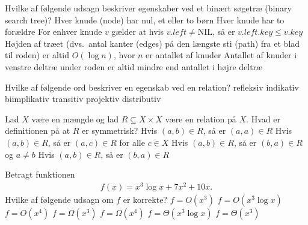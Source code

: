 Hvilke af følgende udsagn beskriver egenskaber ved et binært søgetræ (binary search tree)?
\fleresvar
\mulighederstart
\svar Hver knude (node) har nul, et eller to børn \korrekt
\svar Hver knude har to forældre
\svar For enhver knude $v$ gælder at hvis $v.left \neq \text{NIL}$, så er $v.left.key \leq v.key$ \korrekt
\svar Højden af træet (dvs.~antal kanter (edges) på den længste sti (path) fra et blad til roden) er altid $O(\log n)$, hvor $n$ er antallet af knuder
\svar Antallet af knuder i venstre deltræ under roden er altid mindre end antallet i højre deltræ
\mulighederslut
{}


Hvilke af følgende ord beskriver en egenskab ved en relation?
\fleresvar
\mulighederstart
\svar refleksiv \korrekt
\svar indikativ
\svar biimplikativ
\svar transitiv \korrekt
\svar projektiv
\svar distributiv
\mulighederslut
{}


Lad $X$ være en mængde og lad $R \subseteq X \times X$ være en relation på $X$.
Hvad er definitionen på at $R$ er symmetrisk?
\etsvar
\mulighederstart
\svar Hvis $(a,b) \in R$, så er $(a,a) \in R$
\svar Hvis $(a,b) \in R$, så er $(a,c) \in R$ for alle $c \in X$
\svar Hvis $(a,b) \in R$, så er $(b,a) \in R$ og $a \neq b$
\svar Hvis $(a,b) \in R$, så er $(b,a) \in R$ \korrekt
\mulighederslut
{}

Betragt funktionen
\begin{align*}
  f(x) = x^{3}\log x + 7x^{2} + 10x.
\end{align*}
Hvilke af følgende udsagn om \(f\) er korrekte?
\fleresvar
\mulighederstart
\svar \(f = O(x^{3})\)
\svar \(f = O(x^{3}\log x)\) \korrekt
\svar \(f = O(x^{4})\) \korrekt
\svar \(f = \Omega(x^{3})\) \korrekt
\svar \(f = \Omega(x^{4})\)
\svar \(f = \Theta(x^{3}\log x)\) \korrekt
\svar \(f = \Theta(x^{3})\) 
\mulighederslut
{}

